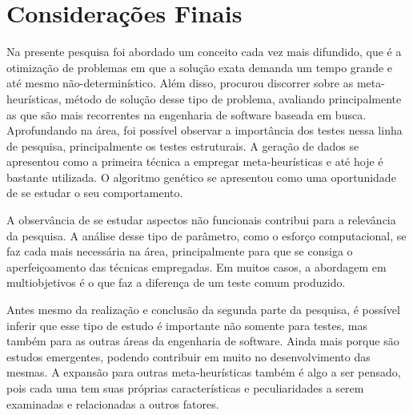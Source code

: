 \chapter[Considerações Finais]{Considerações Finais}
\label{conclusoes}

Na presente pesquisa foi abordado um conceito cada vez mais difundido, que é a otimização de problemas em que a solução exata demanda um tempo grande e até mesmo não-determinístico. Além disso, procurou discorrer sobre as meta-heurísticas, método de solução desse tipo de problema, avaliando principalmente as que são mais recorrentes na engenharia de software baseada em busca. Aprofundando na área, foi possível observar a importância dos testes nessa linha de pesquisa, principalmente os testes estruturais. A geração de dados se apresentou como a primeira técnica a empregar meta-heurísticas e até hoje é bastante utilizada. O algoritmo genético se apresentou como uma oportunidade de se estudar o seu comportamento.

A observância de se estudar aspectos não funcionais contribui para a relevância da pesquisa. A análise desse tipo de parâmetro, como o esforço computacional, se faz cada mais necessária na área, principalmente para que se consiga o aperfeiçoamento das técnicas empregadas. Em muitos casos, a abordagem em multiobjetivos é o que faz a diferença de um teste comum produzido. 

Antes mesmo da realização e conclusão da segunda parte da pesquisa, é possível inferir que esse tipo de estudo é importante não somente para testes, mas também para as outras áreas da engenharia de software. Ainda mais porque são estudos emergentes, podendo contribuir em muito no desenvolvimento das mesmas. A expansão para outras meta-heurísticas também é algo a ser pensado, pois cada uma tem suas próprias características e peculiaridades a serem examinadas e relacionadas a outros fatores.
